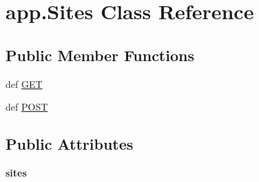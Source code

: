 \hypertarget{classapp_1_1_sites}{\section{app.\+Sites Class Reference}
\label{classapp_1_1_sites}
}
\subsection*{Public Member Functions}
\begin{DoxyCompactItemize}
\item 
def \hyperlink{classapp_1_1_sites_adb41a4db7b595d89e714055f84089118}{G\+E\+T}
\item 
def \hyperlink{classapp_1_1_sites_a424ac03e47b9da2577a264b27f34080c}{P\+O\+S\+T}
\end{DoxyCompactItemize}
\subsection*{Public Attributes}
\begin{DoxyCompactItemize}
\item 
\hypertarget{classapp_1_1_sites_afa224577ebf6d1b1cb2540a40465c244}{{\bfseries sites}}\label{classapp_1_1_sites_afa224577ebf6d1b1cb2540a40465c244}

\end{DoxyCompactItemize}


